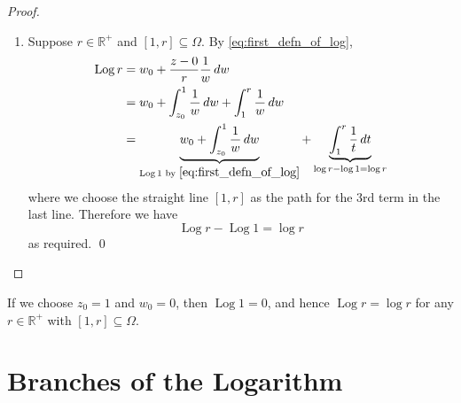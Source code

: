 \documentclass[notoc,notitlepage]{tufte-book}
\DeclareMathOperator{\Log}{Log}
\begin{document}
\begin{proof}
\begin{enumerate}
    \item Suppose $r \in \mathbb{R}^+$ and $[1, r] \subseteq \Omega$. By \cref{eq:first_defn_of_log},
    \begin{align*}
      \Log r &= w_0 + \frac{z-0}{r} \frac{1}{w} \dif{w} \\
        &= w_0 + \int_{z_0}^{1} \frac{1}{w} \dif{w} + \int_{1}^{r} \frac{1}{w} \dif{w} \\
        &= \underbrace{w_0 + \int_{z_0}^{1} \frac{1}{w} \dif{w} }_{\Log 1 \text{ by } \cref{eq:first_defn_of_log}} + \underbrace{\int_{1}^{r} \frac{1}{t} \dif{t} }_{\log r - \log 1 = \log r}
    \end{align*}
    where we choose the straight line $[1, r]$ as the path for the 3rd term in the last line. Therefore we have
    \begin{equation*}
      \Log r - \Log 1 = \log r
    \end{equation*}
    as required. \qed
  \end{enumerate}
\end{proof}

\begin{note}
  If we choose $z_0 = 1$ and $w_0 = 0$, then $\Log 1 = 0$, and hence $\Log r = \log r$ for any $r \in \mathbb{R}^+$ with $[1, r] \subseteq \Omega$.
\end{note}


\section{Branches of the Logarithm} %
\label{sec:branches_of_the_logarithm}
\end{document}
